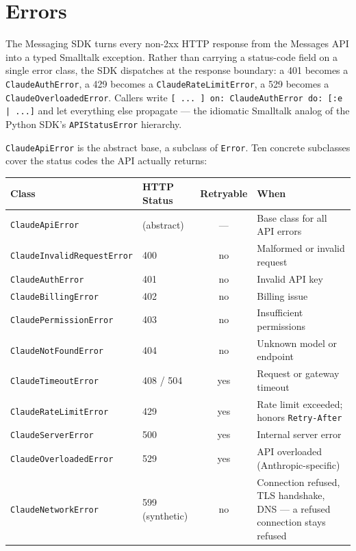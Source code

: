 \documentclass[a4paper,10pt,fleqn]{article}
\begin{document}
\section{Errors}
\label{sec:errors}

The Messaging SDK turns every non-2xx HTTP response from the
Messages API into a typed Smalltalk exception.  Rather than carrying
a status-code field on a single error class, the SDK dispatches at
the response boundary: a 401 becomes a \texttt{ClaudeAuthError},
a 429 becomes a \texttt{ClaudeRateLimitError}, a 529 becomes a
\texttt{ClaudeOverloadedError}.  Callers write
\texttt{[ ... ] on: ClaudeAuthError do: [:e | ...]} and let
everything else propagate --- the idiomatic Smalltalk analog of the
Python SDK's \texttt{APIStatusError} hierarchy.

\texttt{ClaudeApiError} is the abstract base, a subclass of
\texttt{Error}.  Ten concrete subclasses cover the status codes
the API actually returns:

\begin{center}
\begin{tabular}{@{}l l c p{5.6cm}@{}}
\toprule
\textbf{Class} & \textbf{HTTP Status} & \textbf{Retryable} & \textbf{When} \\
\midrule
\texttt{ClaudeApiError}            & (abstract)       & ---  & Base class for all API errors \\
\texttt{ClaudeInvalidRequestError} & 400              & no   & Malformed or invalid request \\
\texttt{ClaudeAuthError}           & 401              & no   & Invalid API key \\
\texttt{ClaudeBillingError}        & 402              & no   & Billing issue \\
\texttt{ClaudePermissionError}     & 403              & no   & Insufficient permissions \\
\texttt{ClaudeNotFoundError}       & 404              & no   & Unknown model or endpoint \\
\texttt{ClaudeTimeoutError}        & 408 / 504        & yes  & Request or gateway timeout \\
\texttt{ClaudeRateLimitError}      & 429              & yes  & Rate limit exceeded; honors \texttt{Retry-After} \\
\texttt{ClaudeServerError}         & 500              & yes  & Internal server error \\
\texttt{ClaudeOverloadedError}     & 529              & yes  & API overloaded (Anthropic-specific) \\
\texttt{ClaudeNetworkError}        & 599 (synthetic)  & no   & Connection refused, TLS handshake, DNS --- a refused connection stays refused \\
\bottomrule
\end{tabular}
\end{center}
\end{document}

